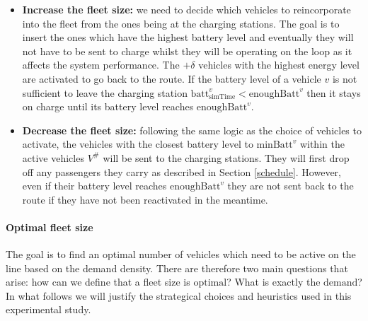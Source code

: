 \documentclass[12pt,a4paper]{article}
\begin{document}
\begin{itemize}
\setlength\itemsep{1pt}
\item \textbf{Increase the fleet size:} we need to decide which vehicles to reincorporate into the fleet from the ones being at the charging stations. The goal is to insert the ones which have the highest battery level and eventually they will not have to be sent to charge whilst they will be operating on the loop as it affects the system performance. The $+\delta$ vehicles with the highest energy level are activated to go back to the route. If the battery level of a vehicle $v$ is not sufficient to leave the charging station $\text{batt}_{\text{simTime}}^{v} < \text{enoughBatt}^{v}$ then it stays on charge until its battery level reaches $\text{enoughBatt}^{v}$.
\item \textbf{Decrease the fleet size:} following the same logic as the choice of vehicles to activate, the vehicles with the closest battery level to $\text{minBatt}^{v}$ within the active vehicles $V^{\#}$ will be sent to the charging stations. They will first drop off any passengers they carry as described in Section \ref{schedule}. However, even if their battery level reaches $\text{enoughBatt}^{v}$ they are not sent back to the route if they have not been reactivated in the meantime.
\end{itemize}

\paragraph{Optimal fleet size}\label{optfleetsize} The goal is to find an optimal number of vehicles which need to be active on the line based on the demand density. There are therefore two main questions that arise: how can we define that a fleet size is $\text{optimal}$? What is exactly the $\text{demand}$? In what follows we will justify the strategical choices and heuristics used in this experimental study.
\end{document}

